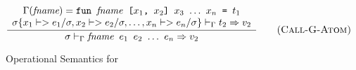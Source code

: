 \documentclass[10pt]{../sigplanconf}
\newcommand{\nfrac}[2]{\frac{\displaystyle{#1}}{\displaystyle{#2}}}
\newcommand{\tagsc}[1]{\tag{\scshape #1}}
\begin{document}
\begin{figure}
\begin{equation}
  \nfrac{
    \begin{array}{c}
      \Gamma(\textit{fname}) =
        \texttt{fun \textit{\rmfamily fname} [$x_1$, $x_2$] $x_3$ $\ldots$ $x_n$ = $t_1$}
        \\
      \sigma\{x_1 |-> e_1/\sigma, x_2 |-> e_2/\sigma, \ldots, x_n |-> e_n/\sigma\} |-_\Gamma t_2 => v_2
    \end{array}
  }{
    \sigma |-_\Gamma \texttt{\textit{\rmfamily fname} $e_1$ $e_2$ $\ldots$ $e_n$} => v_2
  } \tagsc{Call-G-Atom}
\end{equation}


\caption{Operational Semantics for }
\label{fig:semantics}
\end{figure}




\end{document}
